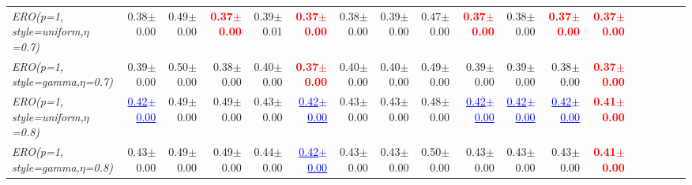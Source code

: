 \documentclass[nohyperref]{article}
\theoremstyle{plain}
\theoremstyle{definition}
\theoremstyle{remark}
\newcommand{\red}[1]{\textcolor{red}{\textbf{#1}}}
\newcommand{\blue}[1]{\textcolor{blue}{\underline{#1}}}
\begin{document}
\begin{table*}[!ht]
{\begin{tabular}{lrrrrrrrrrrrrrrrrr}
			{\it ERO(p=1, style=uniform,$\eta$=0.7)} & 0.38$\pm$0.00 & 0.49$\pm$0.00 & \red{0.37$\pm$0.00} & 0.39$\pm$0.01 & \red{0.37$\pm$0.00} & 0.38$\pm$0.00 & 0.39$\pm$0.00 & 0.47$\pm$0.00 & \red{0.37$\pm$0.00} & 0.38$\pm$0.00  & \red{0.37$\pm$0.00} & \red{0.37$\pm$0.00} \\
			{\it ERO(p=1, style=gamma,$\eta$=0.7)} & 0.39$\pm$0.00 & 0.50$\pm$0.00 & 0.38$\pm$0.00 & 0.40$\pm$0.00 & \red{0.37$\pm$0.00} & 0.40$\pm$0.00 & 0.40$\pm$0.00 & 0.49$\pm$0.00 & 0.39$\pm$0.00 & 0.39$\pm$0.00  & 0.38$\pm$0.00 & \red{0.37$\pm$0.00} \\
			{\it ERO(p=1, style=uniform,$\eta$=0.8)} & \blue{0.42$\pm$0.00} & 0.49$\pm$0.00 & 0.49$\pm$0.00 & 0.43$\pm$0.00 & \blue{0.42$\pm$0.00} & 0.43$\pm$0.00 & 0.43$\pm$0.00 & 0.48$\pm$0.00 & \blue{0.42$\pm$0.00} & \blue{0.42$\pm$0.00}  & \blue{0.42$\pm$0.00} & \red{0.41$\pm$0.00} \\
			{\it ERO(p=1, style=gamma,$\eta$=0.8)} & 0.43$\pm$0.00 & 0.49$\pm$0.00 & 0.49$\pm$0.00 & 0.44$\pm$0.00 & \blue{0.42$\pm$0.00} & 0.43$\pm$0.00 & 0.43$\pm$0.00 & 0.50$\pm$0.00 & 0.43$\pm$0.00 & 0.43$\pm$0.00  & 0.43$\pm$0.00 & \red{0.41$\pm$0.00} \\
\bottomrule
\end{tabular}}
\end{table*}
\end{document}
